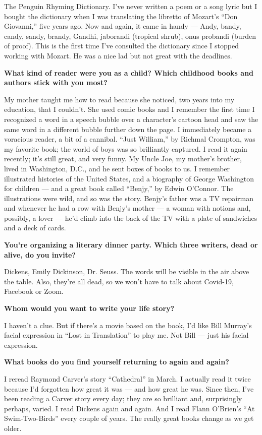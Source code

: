 The Penguin Rhyming Dictionary. I've never written a poem or a song
lyric but I bought the dictionary when I was translating the libretto of
Mozart's ``Don Giovanni,'' five years ago. Now and again, it came in
handy --- Andy, bandy, candy, sandy, brandy, Gandhi, jaborandi (tropical
shrub), onus probandi (burden of proof). This is the first time I've
consulted the dictionary since I stopped working with Mozart. He was a
nice lad but not great with the deadlines.

\textbf{What kind of reader were you as a child? Which childhood books
and authors stick with you most?}

My mother taught me how to read because she noticed, two years into my
education, that I couldn't. She used comic books and I remember the
first time I recognized a word in a speech bubble over a character's
cartoon head and saw the same word in a different bubble further down
the page. I immediately became a voracious reader, a bit of a cannibal.
``Just William,'' by Richmal Crompton, was my favorite book; the world
of boys was so brilliantly captured. I read it again recently; it's
still great, and very funny. My Uncle Joe, my mother's brother, lived in
Washington, D.C., and he sent boxes of books to us. I remember
illustrated histories of the United States, and a biography of George
Washington for children --- and a great book called ``Benjy,'' by Edwin
O'Connor. The illustrations were wild, and so was the story. Benjy's
father was a TV repairman and whenever he had a row with Benjy's mother
--- a woman with notions and, possibly, a lover --- he'd climb into the
back of the TV with a plate of sandwiches and a deck of cards.

\textbf{You're organizing a literary dinner party. Which three writers,
dead or alive, do you invite?}

Dickens, Emily Dickinson, Dr. Seuss. The words will be visible in the
air above the table. Also, they're all dead, so we won't have to talk
about Covid-19, Facebook or Zoom.

\textbf{Whom would you want to write your life story?}

I haven't a clue. But if there's a movie based on the book, I'd like
Bill Murray's facial expression in ``Lost in Translation'' to play me.
Not Bill --- just his facial expression.

\textbf{What books do you find yourself returning to again and again?}

I reread Raymond Carver's story ``Cathedral'' in March. I actually read
it twice because I'd forgotten how great it was --- and how great he
was. Since then, I've been reading a Carver story every day; they are so
brilliant and, surprisingly perhaps, varied. I read Dickens again and
again. And I read Flann O'Brien's ``At Swim-Two-Birds'' every couple of
years. The really great books change as we get older.


